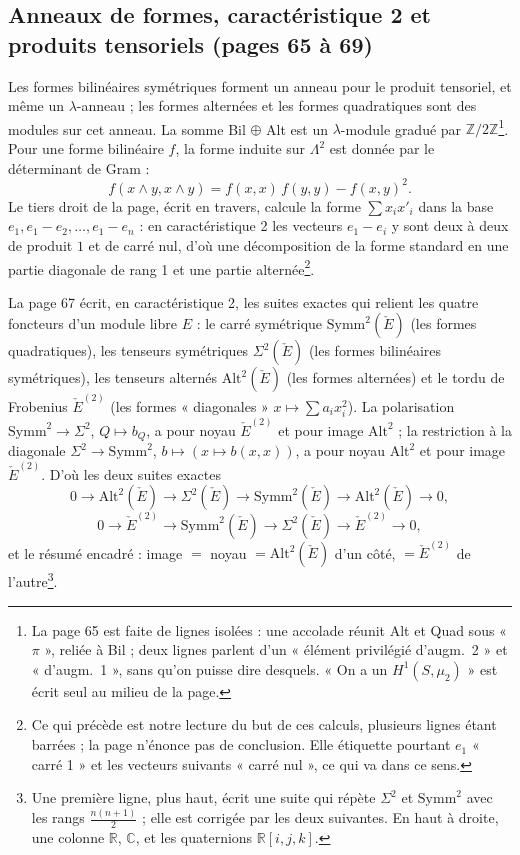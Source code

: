 \documentclass[11pt,a4paper]{article}
\begin{document}
\subsection*{Anneaux de formes, caractéristique 2 et produits tensoriels (pages 65 à 69)}

Les formes bilinéaires symétriques forment un anneau pour le produit tensoriel,
et même un $\lambda$-anneau ; les formes alternées et les formes quadratiques sont
des modules sur cet anneau. La somme Bil $\oplus$ Alt est un $\lambda$-module gradué
par $\mathbb{Z}/2\mathbb{Z}$\footnote{La page 65 est faite de lignes isolées : une
accolade réunit Alt et Quad sous « $\pi$ », reliée à Bil ; deux lignes parlent
d'un « élément privilégié d'augm.\ 2 » et « d'augm.\ 1 », sans qu'on puisse dire
desquels. « On a un $H^1(S,\mu_2)$ » est écrit seul au milieu de la page.}. Pour une
forme bilinéaire $f$, la forme induite sur $\Lambda^2$ est donnée par le
déterminant de Gram :
\[
f(x \wedge y, x \wedge y) = f(x,x)\, f(y,y) - f(x,y)^2 .
\]
Le tiers droit de la page, écrit en travers, calcule la forme $\sum x_i x'_i$ dans
la base $e_1, e_1 - e_2, \ldots, e_1 - e_n$ : en caractéristique 2 les vecteurs
$e_1 - e_i$ y sont deux à deux de produit $1$ et de carré nul, d'où une
décomposition de la forme standard en une partie diagonale de rang 1 et une
partie alternée\footnote{Ce qui précède est notre lecture du but de ces calculs,
plusieurs lignes étant barrées ; la page n'énonce pas de conclusion. Elle
étiquette pourtant $e_1$ « carré 1 » et les vecteurs suivants « carré nul », ce
qui va dans ce sens.}.

La page 67 écrit, en caractéristique 2, les suites exactes qui relient les
quatre foncteurs d'un module libre $E$ : le carré symétrique
$\mathrm{Symm}^2(\check E)$ (les formes quadratiques), les tenseurs symétriques
$\Sigma^2(\check E)$ (les formes bilinéaires symétriques), les tenseurs
alternés $\mathrm{Alt}^2(\check E)$ (les formes alternées) et le tordu de
Frobenius $\check E^{(2)}$ (les formes « diagonales » $x \mapsto \sum a_i x_i^2$).
La polarisation $\mathrm{Symm}^2 \to \Sigma^2$, $Q \mapsto b_Q$, a pour noyau
$\check E^{(2)}$ et pour image $\mathrm{Alt}^2$ ; la restriction à la diagonale
$\Sigma^2 \to \mathrm{Symm}^2$, $b \mapsto (x \mapsto b(x,x))$, a pour noyau
$\mathrm{Alt}^2$ et pour image $\check E^{(2)}$. D'où les deux suites exactes
\[
0 \to \mathrm{Alt}^2(\check E) \to \Sigma^2(\check E) \to
\mathrm{Symm}^2(\check E) \to \mathrm{Alt}^2(\check E) \to 0,
\]
\[
0 \to \check E^{(2)} \to \mathrm{Symm}^2(\check E) \to \Sigma^2(\check E)
\to \check E^{(2)} \to 0,
\]
et le résumé encadré : image $=$ noyau $= \mathrm{Alt}^2(\check E)$ d'un côté,
$= \check E^{(2)}$ de l'autre\footnote{Une première ligne, plus haut, écrit une
suite qui répète $\Sigma^2$ et $\mathrm{Symm}^2$ avec les rangs
$\frac{n(n+1)}{2}$ ; elle est corrigée par les deux suivantes. En haut à droite,
une colonne $\mathbb{R}$, $\mathbb{C}$, et les quaternions $\mathbb{R}[i,j,k]$.}.
\end{document}
